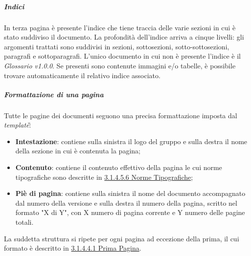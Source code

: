 \subparagraph{Indici}
In terza pagina è presente l'indice che tiene traccia delle varie sezioni in cui è stato suddiviso il documento. La profondità dell'indice arriva a cinque livelli: gli argomenti trattati sono suddivisi in sezioni, sottosezioni, sotto-sottosezioni, paragrafi e sottoparagrafi. L'unico documento in cui non è presente l'indice è il \textit{Glossario v1.0.0}.
Se presenti sono contenute immagini e/o tabelle, è possibile trovare automaticamente il relativo indice associato.
\subparagraph{Formattazione di una pagina}
Tutte le pagine dei documenti seguono una precisa formattazione imposta dal \textit{template}\G :
\begin{itemize}
	\item{\textbf{Intestazione}}: contiene sulla sinistra il logo del gruppo e sulla destra il nome della sezione in cui è contenuta la pagina;
	\item{\textbf{Contenuto}}: contiene il contenuto effettivo della pagina le cui norme tipografiche sono descritte in \hyperref[sec:normeTipografiche]{3.1.4.5.6 Norme Tipografiche};
	\item{\textbf{Piè di pagina}}: contiene sulla sinistra il nome del documento accompagnato dal numero della versione e sulla destra il numero della pagina, scritto nel formato "X di Y", con X numero di pagina corrente e Y numero delle pagine totali.
\end{itemize}
La suddetta struttura si ripete per ogni pagina ad eccezione della prima, il cui formato è descritto in \hyperref[sec:primaPagina]{3.1.4.4.1 Prima Pagina}.

